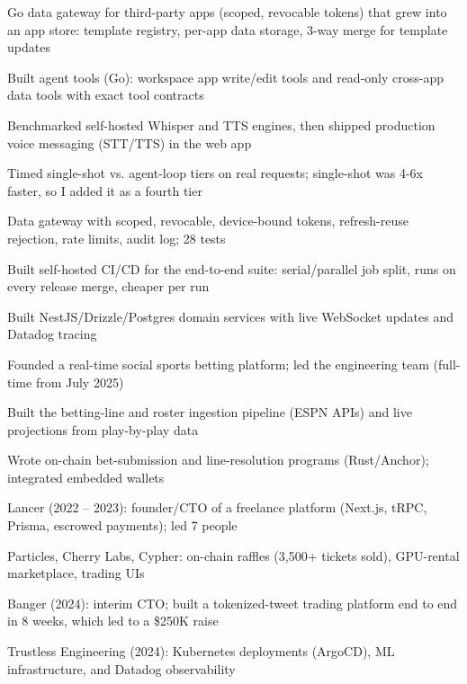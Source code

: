 \documentclass[print]{jack-resume}
\begin{document}
\begin{tightemize}
    \item Go data gateway for third-party apps (scoped, revocable tokens) that grew into an app store: template registry, per-app data storage, 3-way merge for template updates
    \item Built agent tools (Go): workspace app write/edit tools and read-only cross-app data tools with exact tool contracts
    \item Benchmarked self-hosted Whisper and TTS engines, then shipped production voice messaging (STT/TTS) in the web app
    \item Timed single-shot vs. agent-loop tiers on real requests; single-shot was 4-6x faster, so I added it as a fourth tier
    \item Data gateway with scoped, revocable, device-bound tokens, refresh-reuse rejection, rate limits, audit log; 28 tests
    \item Built self-hosted CI/CD for the end-to-end suite: serial/parallel job split, runs on every release merge, cheaper per run
\end{tightemize}
\sectionsep

\begin{tightemize}
    \item Built NestJS/Drizzle/Postgres domain services with live WebSocket updates and Datadog tracing
    \item Founded a real-time social sports betting platform; led the engineering team (full-time from July 2025)
    \item Built the betting-line and roster ingestion pipeline (ESPN APIs) and live projections from play-by-play data
    \item Wrote on-chain bet-submission and line-resolution programs (Rust/Anchor); integrated embedded wallets
\end{tightemize}
\sectionsep

\begin{tightemize}
    \item Lancer (2022 – 2023): founder/CTO of a freelance platform (Next.js, tRPC, Prisma, escrowed payments); led 7 people
    \item Particles, Cherry Labs, Cypher: on-chain raffles (3,500+ tickets sold), GPU-rental marketplace, trading UIs
    \item Banger (2024): interim CTO; built a tokenized-tweet trading platform end to end in 8 weeks, which led to a \$250K raise
    \item Trustless Engineering (2024): Kubernetes deployments (ArgoCD), ML infrastructure, and Datadog observability
\end{tightemize}
\sectionsep
\end{document}
